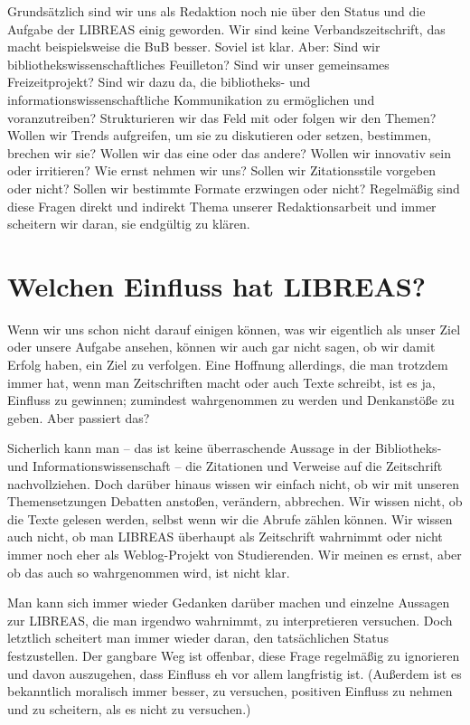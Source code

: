 \documentclass[output=paper]{langscibook}
\begin{document}
Grundsätzlich sind wir uns als Redaktion noch nie über den Status und die Aufgabe der LIBREAS einig geworden. Wir sind keine Verbandszeitschrift, das macht beispielsweise die BuB besser. Soviel ist klar. Aber: Sind wir bibliothekswissenschaftliches Feuilleton? Sind wir unser gemeinsames Freizeitprojekt? Sind wir dazu da, die bibliotheks- und informationswissenschaftliche Kommunikation zu ermöglichen und voranzutreiben? Strukturieren wir das Feld mit oder folgen wir den Themen? Wollen wir Trends aufgreifen, um sie zu diskutieren oder setzen, bestimmen, brechen wir sie? Wollen wir das eine oder das andere? Wollen wir innovativ sein oder irritieren? Wie ernst nehmen wir uns? Sollen wir Zitationsstile vorgeben oder nicht? Sollen wir bestimmte Formate erzwingen oder nicht? Regelmäßig sind diese Fragen direkt und indirekt Thema unserer Redaktionsarbeit und immer scheitern wir daran, sie endgültig zu klären.

\section*{Welchen Einfluss hat LIBREAS?}\label{Welchen Einfluss hat LIBREAS?} 

Wenn wir uns schon nicht darauf einigen können, was wir eigentlich als unser Ziel oder unsere Aufgabe ansehen, können wir auch gar nicht sagen, ob wir damit Erfolg haben, ein Ziel zu verfolgen. Eine Hoffnung allerdings, die man trotzdem immer hat, wenn man Zeitschriften macht oder auch Texte schreibt, ist es ja, Einfluss zu gewinnen; zumindest wahrgenommen zu werden und Denkanstöße zu geben. Aber passiert das?

Sicherlich kann man – das ist keine überraschende Aussage in der Bibliotheks- und Informationswissenschaft – die Zitationen und Verweise auf die Zeitschrift nachvollziehen. Doch darüber hinaus wissen wir einfach nicht, ob wir mit unseren Themensetzungen Debatten anstoßen, verändern, abbrechen. Wir wissen nicht, ob die Texte gelesen werden, selbst wenn wir die Abrufe zählen können. Wir wissen auch nicht, ob man LIBREAS überhaupt als Zeitschrift wahrnimmt oder nicht immer noch eher als Weblog-Projekt von Studierenden. Wir meinen es ernst, aber ob das auch so wahrgenommen wird, ist nicht klar.

Man kann sich immer wieder Gedanken darüber machen und einzelne Aussagen zur LIBREAS, die man irgendwo wahrnimmt, zu interpretieren versuchen. Doch letztlich scheitert man immer wieder daran, den tatsächlichen Status festzustellen. Der gangbare Weg ist offenbar, diese Frage regelmäßig zu ignorieren und davon auszugehen, dass Einfluss eh vor allem langfristig ist. (Außerdem ist es bekanntlich moralisch immer besser, zu versuchen, positiven Einfluss zu nehmen und zu scheitern, als es nicht zu versuchen.)
\end{document}
